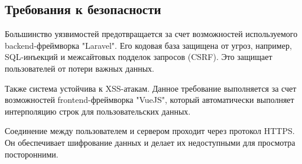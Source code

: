 \documentclass[other-needs.tex]{subfiles}
\begin{document}
\subsection{Требования к безопасности}
\par
Большинство уязвимостей предотвращается за счет возможностей используемого backend-фреймворка "Laravel".
Его кодовая база защищена от угроз, например, SQL-инъекций и межсайтовых подделок запросов (CSRF). 
Это защищает пользователей от потери важных данных.
\par
Также система устойчива к XSS-атакам. 
Данное требование выполняется за счет возможностей frontend-фреймворка "VueJS"{}, 
который автоматически выполняет интерполяцию строк для пользовательских данных.
\par
Соединение между пользователем и сервером проходит через протокол HTTPS. 
Он обеспечивает шифрование данных и делает их недоступными для просмотра посторонними.
\end{document}
